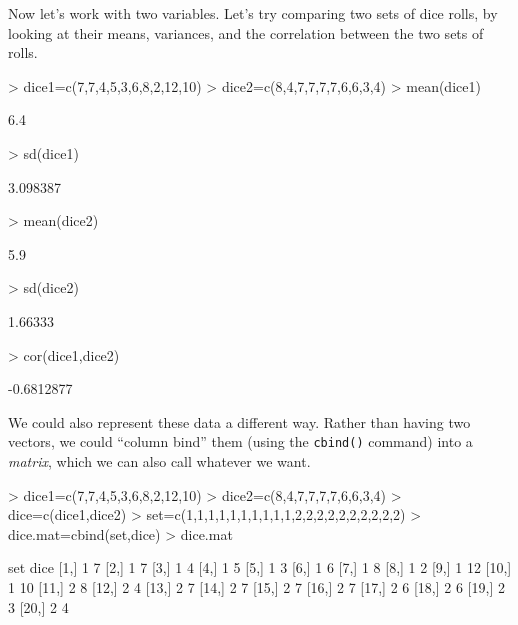 \documentclass[12pt]{article}
\begin{document}
Now let's work with two variables. Let's try comparing two sets of dice rolls, by looking at their means, variances, and the correlation between the two sets of rolls.
\begin{Schunk}
\begin{Sinput}
> dice1=c(7,7,4,5,3,6,8,2,12,10)
> dice2=c(8,4,7,7,7,7,6,6,3,4)
> mean(dice1)
\end{Sinput}
\begin{Soutput}
[1] 6.4
\end{Soutput}
\begin{Sinput}
> sd(dice1)
\end{Sinput}
\begin{Soutput}
[1] 3.098387
\end{Soutput}
\begin{Sinput}
> mean(dice2)
\end{Sinput}
\begin{Soutput}
[1] 5.9
\end{Soutput}
\begin{Sinput}
> sd(dice2)
\end{Sinput}
\begin{Soutput}
[1] 1.66333
\end{Soutput}
\begin{Sinput}
> cor(dice1,dice2)
\end{Sinput}
\begin{Soutput}
[1] -0.6812877
\end{Soutput}
\end{Schunk}

We could also represent these data a different way. Rather than having two vectors, we could ``column bind'' them (using the \verb|cbind()| command) into a \emph{matrix}, which we can also call whatever we want.
\begin{Schunk}
\begin{Sinput}
> dice1=c(7,7,4,5,3,6,8,2,12,10)
> dice2=c(8,4,7,7,7,7,6,6,3,4)
> dice=c(dice1,dice2)
> set=c(1,1,1,1,1,1,1,1,1,1,2,2,2,2,2,2,2,2,2,2)
> dice.mat=cbind(set,dice)
> dice.mat
\end{Sinput}
\begin{Soutput}
      set dice
 [1,]   1    7
 [2,]   1    7
 [3,]   1    4
 [4,]   1    5
 [5,]   1    3
 [6,]   1    6
 [7,]   1    8
 [8,]   1    2
 [9,]   1   12
[10,]   1   10
[11,]   2    8
[12,]   2    4
[13,]   2    7
[14,]   2    7
[15,]   2    7
[16,]   2    7
[17,]   2    6
[18,]   2    6
[19,]   2    3
[20,]   2    4
\end{Soutput}
\end{Schunk}
\end{document}
